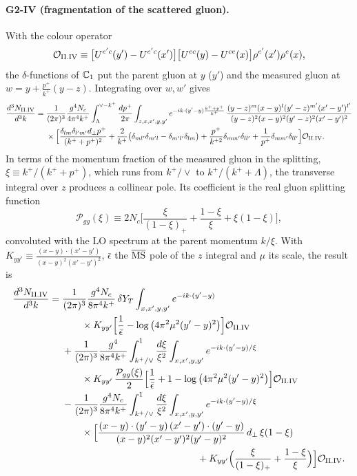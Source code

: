 \paragraph*{G2-IV (fragmentation of the scattered gluon).} With the colour operator
\begin{equation}
\mathcal{O}_{\rm II.IV}\equiv\big[U^{e'c}(y')-U^{e'c}(x')\big]\big[U^{ec}(y)-U^{ce}(x)\big]\rho^{e'}(x')\rho^e(x),
\end{equation}
the $\delta$-functions of $\mathbb{C}_1$ put the parent gluon at $y$ ($y'$) and the measured gluon at $w=y+\frac{p^+}{k^+}(y-z)$. Integrating over $w,w'$ gives
\begin{align}
\frac{d^3N_{\rm II.IV}}{d^3k}={}&\frac{1}{(2\pi)^3}\frac{g^4N_c}{4\pi^4k^+}\int_{\Lambda}^{\vee-k^+}\frac{dp^+}{2\pi}\int_{z,x,x',y,y'}e^{-ik\cdot(y'-y)\frac{k^++p^+}{k^+}}\,\frac{(y-z)^m(x-y)^l(y'-z)^{m'}(x'-y')^{l'}}{(y-z)^2(x-y)^2(y'-z)^2(x'-y')^2}\notag\\
&\times\Big[\frac{\delta_{lm}\delta_{l'm'}d_\perp p^+}{(k^++p^+)^2}+\frac{2}{k^+}\big(\delta_{ml'}\delta_{m'l}-\delta_{m'l'}\delta_{lm}\big)+\frac{p^+}{k^{+2}}\delta_{mm'}\delta_{ll'}+\frac{1}{p^+}\delta_{mm'}\delta_{ll'}\Big]\mathcal{O}_{\rm II.IV}.
\label{eq:GIIIV}
\end{align}
In terms of the momentum fraction of the measured gluon in the splitting, $\xi\equiv k^+/(k^++p^+)$, which runs from $k^+/\vee$ to $k^+/(k^++\Lambda)$, the transverse integral over $z$ produces a collinear pole. Its coefficient is the real gluon splitting function
\begin{equation}
\mathcal P_{gg}(\xi)\equiv2N_c\Big[\frac{\xi}{(1-\xi)_+}+\frac{1-\xi}{\xi}+\xi(1-\xi)\Big],
\label{eq:Pgg}
\end{equation}
convoluted with the LO spectrum at the parent momentum $k/\xi$. With $K_{yy'}\equiv\frac{(x-y)\cdot(x'-y')}{(x-y)^2(x'-y')^2}$, $\bar\epsilon$ the $\overline{\rm MS}$ pole of the $z$ integral and $\mu$ its scale, the result is
\begin{align}
\frac{d^3N_{\rm II.IV}}{d^3k}={}&\frac{1}{(2\pi)^3}\frac{g^4N_c}{8\pi^4k^+}\,\delta Y_T\int_{x,x',y,y'}e^{-ik\cdot(y'-y)}\notag\\
&\qquad\times K_{yy'}\Big[\frac{1}{\bar\epsilon}-\log\big(4\pi^2\mu^2(y'-y)^2\big)\Big]\Ord_{\rm II.IV}\notag\\
&+\frac{1}{(2\pi)^3}\frac{g^4}{8\pi^4k^+}\int_{k^+/\vee}^{1}\frac{d\xi}{\xi^2}\int_{x,x',y,y'}e^{-ik\cdot(y'-y)/\xi}\notag\\
&\qquad\times K_{yy'}\,\frac{\mathcal P_{gg}(\xi)}{2}\Big[\frac{1}{\bar\epsilon}+1-\log\big(4\pi^2\mu^2(y'-y)^2\big)\Big]\Ord_{\rm II.IV}\notag\\
&-\frac{1}{(2\pi)^3}\frac{g^4N_c}{8\pi^4k^+}\int_{k^+/\vee}^{1}\frac{d\xi}{\xi^2}\int_{x,x',y,y'}e^{-ik\cdot(y'-y)/\xi}\notag\\
&\qquad\times\Big[\frac{(x-y)\cdot(y'-y)\,(x'-y')\cdot(y'-y)}{(x-y)^2(x'-y')^2(y'-y)^2}\,d_\perp\,\xi(1-\xi)\notag\\
&\hspace{14em}+K_{yy'}\Big(\frac{\xi}{(1-\xi)_+}+\frac{1-\xi}{\xi}\Big)\Big]\Ord_{\rm II.IV}.
\label{eq:GIIIVres}
\end{align}
